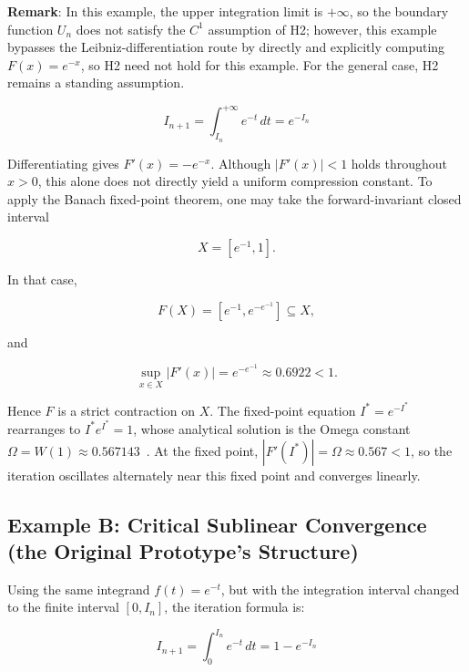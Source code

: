 \documentclass[11pt,a4paper]{amsart}
\begin{document}
\textbf{Remark}: In this example, the upper integration limit is $+\infty$, so the boundary function $U_n$ does not satisfy the $C^1$ assumption of H2; however, this example bypasses the Leibniz-differentiation route by directly and explicitly computing $F(x)=e^{-x}$, so H2 need not hold for this example. For the general case, H2 remains a standing assumption.

\begin{equation}
\label{eq:example-a}
I_{n+1} = \int_{I_n}^{+\infty} e^{-t} \, dt = e^{-I_n}
\end{equation}

Differentiating gives $F'(x) = -e^{-x}$. Although $|F'(x)| < 1$ holds throughout $x > 0$, this alone does not directly yield a uniform compression constant. To apply the Banach fixed-point theorem, one may take the forward-invariant closed interval

\begin{equation}
\label{eq:interval-X}
X = [e^{-1}, 1].
\end{equation}

In that case,

\begin{equation}
\label{eq:FX-subset}
F(X) = [e^{-1}, e^{-e^{-1}}] \subseteq X,
\end{equation}

and

\begin{equation}
\label{eq:sup-deriv}
\sup_{x\in X}|F'(x)| = e^{-e^{-1}} \approx 0.6922 < 1.
\end{equation}

Hence $F$ is a strict contraction on $X$. The fixed-point equation $I^* = e^{-I^*}$ rearranges to $I^* e^{I^*} = 1$, whose analytical solution is the Omega constant $\Omega = W(1) \approx 0.567143$~\cite{corless1996}. At the fixed point, $|F'(I^*)| = \Omega \approx 0.567 < 1$, so the iteration oscillates alternately near this fixed point and converges linearly.

\subsection{Example B: Critical Sublinear Convergence (the Original Prototype's Structure)}

Using the same integrand $f(t)=e^{-t}$, but with the integration interval changed to the finite interval $[0, I_n]$, the iteration formula is:

\begin{equation}
\label{eq:example-b}
I_{n+1} = \int_{0}^{I_n} e^{-t} \, dt = 1 - e^{-I_n}
\end{equation}
\end{document}
